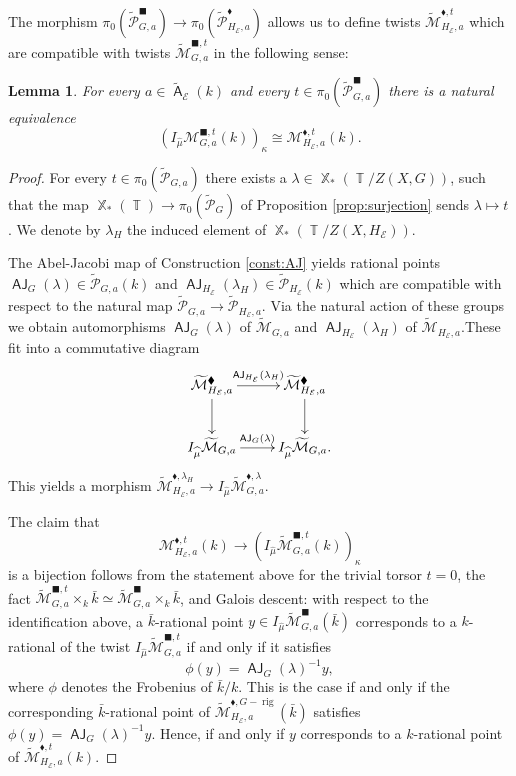 \documentclass{article}
\DeclareMathOperator{\rig}{rig}
\DeclareMathOperator{\A}{\mathsf{A}}
\newcommand{\Ec}{\mathcal{E}}
\DeclareMathOperator{\Zb}{\mathbb{Z}}
\DeclareMathOperator{\Xb}{\mathbb{X}}
\DeclareMathOperator{\Tb}{\mathbb{T}}
\newcommand{\Mc}{\mathcal{M}}
\DeclareMathOperator{\Qb}{\mathbb{Q}}
\newcommand{\CE}{{\mathcal E}}
\DeclareMathOperator{\AJ}{\mathsf{AJ}}
\newcommand{\wpc}{\widetilde{\mathcal{P}} }
\newcommand{\wmc}{\widetilde{\Mc} }
\newcommand{\wac}{\widetilde{\A} }
\theoremstyle{definition}
\theoremstyle{plain}
\newtheorem{lemma}[definition]{Lemma}
\begin{document}
The morphism $ \pi_0(\wpc_{G,a}^\blacksquare) \to  \pi_0(\wpc_{H_{\Ec},a}^\blacklozenge)$ allows us to define twists $\wmc_{{H}_{\Ec},a}^{\blacklozenge,t}$ which are compatible with twists $\wmc_{{G},a}^{\blacksquare,t}$ in the following sense:


\begin{lemma}%

For every $a \in \wac_\CE(k)$ and every $t \in \pi_0(\wpc_{G,a}^{\blacksquare})$ there is a natural equivalence
\[    \left(I_{\widehat{\mu}}\Mc_{G,a}^{\blacksquare,t}(k)\right)_{\kappa} \cong \Mc_{H_{\Ec},a}^{\blacklozenge,t}(k).
\]
\end{lemma}

\begin{proof}
For every $t \in \pi_0(\wpc_{G,a})$ there exists a $\lambda \in \Xb_*(\Tb/Z(X,G))$, such that the map $\Xb_*(\Tb) \to \pi_0(\wpc_G)$ of Proposition \ref{prop:surjection} sends $\lambda \mapsto t$. We denote by $\lambda_H$ the induced element of $\Xb_*(\Tb/Z(X,H_{\Ec}))$.

The Abel-Jacobi map of Construction \ref{const:AJ} yields rational points $\AJ_{G}(\lambda)\in \wpc_{G,a}(k)$ and $\AJ_{{H}_{\Ec}}(\lambda_H) \in \wpc_{{H}_{\Ec}}(k)$ which are compatible with respect to the natural map $\wpc_{G,a} \to \wpc_{{H}_{\Ec},a}$. Via the natural action of these groups we obtain automorphisms $\AJ_G(\lambda)$ of $\widetilde{\Mc}_{G,a}$ and $\AJ_{H_{\Ec}}(\lambda_H)$ of $\widetilde{\Mc}_{H_{\Ec},a}$.These fit into a commutative diagram
\[
\xymatrix{
\widetilde{\Mc}^{\blacklozenge}_{{H}_{\Ec},a} \ar[r]^-{\AJ_{H_{\Ec}}(\lambda_H)} \ar[d] & \widetilde{\Mc}^{\blacklozenge}_{{H}_{\Ec},a} \ar[d] \\
I_{\widehat{\mu}}\widetilde{\Mc}_{G,a} \ar[r]^-{\AJ_{G}(\lambda)} & I_{\widehat{\mu}}\widetilde{\Mc}_{G,a}.
}
\]
This yields a morphism $\widetilde{\Mc}_{H_{\Ec},a}^{\blacklozenge,\lambda_H} \to I_{\widehat{\mu}}\widetilde{\Mc}_{G,a}^{\blacklozenge,\lambda}$.

The claim that 
$$\Mc_{H_{\Ec},a}^{\blacklozenge,t} (k) \to \left(I_{\widehat{\mu}}\wmc_{G,a}^{\blacksquare,t}(k)\right)_{\kappa}$$
is a bijection follows from the statement above for the trivial torsor $t =0$, the fact $\wmc_{G,a}^{\blacksquare,t} \times_{k} \bar{k} \simeq \wmc_{G,a}^{\blacksquare} \times_{k} \bar{k}$, and Galois descent: with respect to the identification above, a $\bar{k}$-rational point $y \in I_{\widehat{\mu}}\wmc_{G,a}^{\blacksquare}(\bar{k})$ corresponds to a $k$-rational of the twist $I_{\widehat{\mu}}\wmc_{G,a}^{\blacksquare,t}$ if and only if it satisfies 
$$\phi(y) = \AJ_G(\lambda)^{-1}y,$$
where $\phi$ denotes the Frobenius of $\bar{k}/k$.
This is the case if and only if the corresponding $\bar{k}$-rational point of $\widetilde{\Mc}_{H_{\Ec},a}^{\blacklozenge,G-\rig} (\bar{k})$ satisfies $\phi(y) = \AJ_G(\lambda)^{-1}y.$ Hence, if and only if $y$ corresponds to a $k$-rational point of $\widetilde{\Mc}_{H_{\Ec},a}^{\blacklozenge,t} (k)$.
\end{proof}
\end{document}
